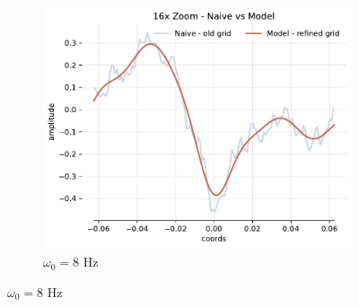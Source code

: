 \begin{figure}[h]
    \begin{subfigure}[b]{0.32\textwidth}
        \centering
        \includegraphics[width=\textwidth]{img/ch4/16x_zoom-1hl-16hf-8hz.pdf}
        \caption{$\omega_0=8$ Hz}
    \end{subfigure}


\end{figure}
